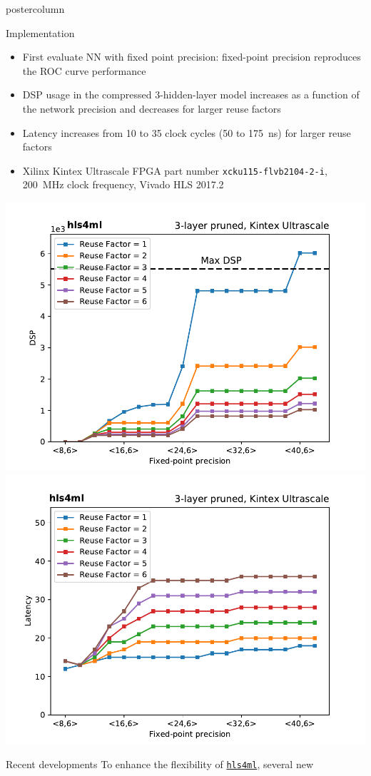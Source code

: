 \documentclass[final,hyperref={pdfpagelabels=false}]{beamer}
\newcommand{\hlsfml}{{\href{https://github.com/hls-fpga-machine-learning/hls4ml}{\texttt{hls4ml}}}}
\begin{document}
\begin{frame}
\begin{columns}
\begin{column}{.49\textwidth}
\begin{beamercolorbox}[center,wd=\textwidth]{postercolumn}
\begin{minipage}[T]{.95\textwidth}
{            \vspace*{\fill}
            \begin{block}{Implementation}
              \begin{itemize}
                \item First evaluate NN with fixed point precision:
                  {\tt <16,6>} fixed-point precision reproduces the
                  ROC curve performance
                \item DSP usage in the compressed 3-hidden-layer model
                  increases as a function of the network precision and
                  decreases for larger reuse factors
                  \item Latency increases from 10 to 35 clock cycles
                    (50 to 175~ns) for larger reuse factors
                  \item Xilinx Kintex Ultrascale FPGA part number
                    \texttt{xcku115-flvb2104-2-i}, 200~MHz clock
                    frequency, Vivado HLS 2017.2
              \end{itemize}
              \begin{center}
                \includegraphics[width=0.49\linewidth]{scan_X_6_KUS_DSP_pruned.pdf}
                \includegraphics[width=0.49\linewidth]{scan_X_6_KUS_Latency_pruned.pdf}
              \end{center}
            \end{block}
                  \begin{block}{Recent developments}
                    To enhance the flexibility of \hlsfml, several new

\end{block}}
\end{minipage}
\end{beamercolorbox}
\end{column}
\end{columns}
\end{frame}
\end{document}
